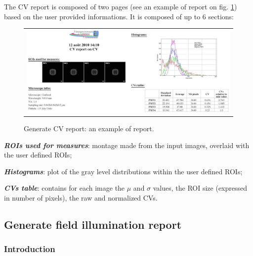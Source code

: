 \documentclass[]{spie}
\begin{document}
The CV report is composed of two pages (see an example of report on fig. \ref{fig:gcvr-report}) based on the user provided informations. It is composed of up to 6 sections:
\begin{figure}[h]
		\begin{center}
		\begin{tabular}{c}
			\includegraphics[width=0.95\linewidth]{img/gcvr-report}
		\end{tabular}
	\end{center}
	\caption{\label{fig:gcvr-report}Generate CV report: an example of report.}
\end{figure} 
\begin{itemize*}
	\item \textbf{\textit{ROIs used for measures}}: montage made from the input images, overlaid with the user defined ROIs;
	\item \textbf{\textit{Histograms}}: plot of the gray level distributions within the user defined ROIs;
	\item \textbf{\textit{CVs table}}: contains for each image the $\mu$ and $\sigma$ values, the ROI size (expressed in number of pixels), the raw and normalized CVs.
\end{itemize*}



\subsection{Generate field illumination report}
\label{subsec:gfir}

\subsubsection*{Introduction}
\label{subsubsec:gfir-intro}
\end{document}
